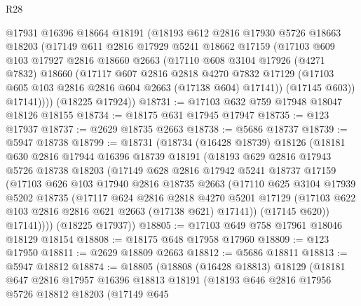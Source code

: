\begin{lexlean}{R28}
\begin{coremodule}
        @17931
        @16396
        @18664
        @18191
        (@18193
          @612
          @2816
          @17930
          @5726
          @18663
          @18203
          (@17149
            @611
            @2816
            @17929
            @5241
            @18662
            @17159
            (@17103
              @609
              @103
              @17927
              @2816
              @18660
              @2663
              (@17110
                @608
                @3104
                @17926
                (@4271 @7832)
                @18660
                (@17117
                  @607
                  @2816
                  @2818
                  @4270
                  @7832
                  @17129
                  (@17103 @605 @103 @2816 @2816 @604 @2663 (@17138 @604) @17141))
                (@17145 @603))
              @17141))))
      (@18225 @17924))
@18731 := @17103 @632 @759 @17948 @18047 @18126 @18155
@18734 := @18175 @631 @17945 @17947
@18735 := @123 @17937
@18737 := @2629 @18735 @2663
@18738 := @5686 @18737
@18739 := @5947 @18738
@18799 := @18731
    (@18734
      (@16428 @18739)
      @18126
      (@18181
        @630
        @2816
        @17944
        @16396
        @18739
        @18191
        (@18193
          @629
          @2816
          @17943
          @5726
          @18738
          @18203
          (@17149
            @628
            @2816
            @17942
            @5241
            @18737
            @17159
            (@17103
              @626
              @103
              @17940
              @2816
              @18735
              @2663
              (@17110
                @625
                @3104
                @17939
                @5202
                @18735
                (@17117
                  @624
                  @2816
                  @2818
                  @4270
                  @5201
                  @17129
                  (@17103 @622 @103 @2816 @2816 @621 @2663 (@17138 @621) @17141))
                (@17145 @620))
              @17141))))
      (@18225 @17937))
@18805 := @17103 @649 @758 @17961 @18046 @18129 @18154
@18808 := @18175 @648 @17958 @17960
@18809 := @123 @17950
@18811 := @2629 @18809 @2663
@18812 := @5686 @18811
@18813 := @5947 @18812
@18874 := @18805
    (@18808
      (@16428 @18813)
      @18129
      (@18181
        @647
        @2816
        @17957
        @16396
        @18813
        @18191
        (@18193
          @646
          @2816
          @17956
          @5726
          @18812
          @18203
          (@17149
            @645

\end{coremodule}
\end{lexlean}
